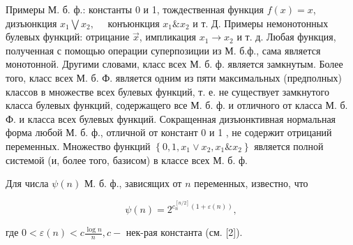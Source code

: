 \documentclass[10pt]{article}
\begin{document}
Примеры М. б. ф.: константы 0 и 1, тождественная функция $f(x)=x$, дизъюнкция $x_{1} \bigvee x_{2}, \quad$ конъюнкция $x_{1} \& x_{2}$ и т. Д. Примеры немонотонных булевых функций: отрицание $\vec{x}$, импликация $x_{1} \rightarrow x_{2}$ и т. д. Любая функция, полученная с помощью операции суперпозиции из М. б.ф., сама является монотонной. Другими словами, класс всех М. б. ф. является замкнутым. Более того, класс всех М. б. Ф. является одним из пяти максимальных (предполных) классов в множестве всех булевых функций, т. е. не существует замкнутого класса булевых функций, содержащего все М. б. ф. и отличного от класса М. б. Ф. и класса всех булевых функций. Сокращенная дизъюнктивная нормальная форма любой М. б. ф., отличной от констант 0 и 1 , не содержит отрицаний переменных. Множество функций $\left\{0,1, x_{1} \vee x_{2}, x_{1} \& x_{2}\right\}$ является полной системой (и, более того, базисом) в классе всех М. б. ф.



Для числа $\psi(n)$ М. б. ф., зависящих от $n$ переменных, известно, что



\[

\psi(n)=2^{c_{n}^{[n / 2]}(1+\varepsilon(n))},

\]



где $0<\varepsilon(n)<c \frac{\log n}{n}, c-$ нек-рая константа (см. [2]).
\end{document}
